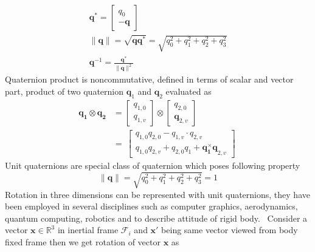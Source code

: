 \begin{gather}
\mathbf{q}^{*} =\begin{bmatrix}
q_{0}\\
-\mathbf{q}
\end{bmatrix} \ \\
\| \mathbf{q} \| =\sqrt{\mathbf{qq}^{*}} =\sqrt{q^{2}_{0} +q^{2}_{1} +q^{2}_{2} +q^{2}_{3}}\\
\mathbf{q}^{-1} =\frac{\mathbf{q}^{*}}{\| \mathbf{q} \| ^{2}}
\end{gather}
Quaternion product is noncommutative, defined in terms of scalar and vector part, product of two quaternion $\displaystyle \mathbf{q}_{1}$ and $\displaystyle \mathbf{q}_{2}$ evaluated as 
\begin{equation}
\label{quatProduct}
\begin{aligned}
\mathbf{q_{1} \otimes q_{2}} & =\begin{bmatrix}
q_{1,0}\\
q_{1,v}
\end{bmatrix} \otimes \begin{bmatrix}
q_{2,0}\\
{\mathbf{q}_{2,v}}
\end{bmatrix}\\
 & =\ \begin{bmatrix}
q_{1,0} q_{2,0} - q_{1,v} \cdot q_{2,v}\\
q_{1,0} q_{2,v} +q_{2,0} q_{1} +\mathbf{q ^{\times }_{1} q}_{2,v}
\end{bmatrix}
\end{aligned} \ 
\end{equation}
Unit quaternions are special class of quaternion which poses following property
\begin{equation}
\| \mathbf{q} \| =\sqrt{q^{2}_{0} +q^{2}_{1} +q^{2}_{2} +q^{2}_{3}} =1
\end{equation}
Rotation in three dimensions can be represented with unit quaternions, they have been employed in several disciplines such as computer graphics, aerodynamics, quantum computing, robotics and to describe attitude of rigid body. \ Consider a vector $\displaystyle \mathbf{x} \in \mathbb{R}^{3}$ in inertial frame $\displaystyle \mathcal{F}_{i}$ and $\displaystyle \mathbf{x} '$ being same vector viewed from body fixed frame then we get rotation of vector $\displaystyle \mathbf{x}$ as
